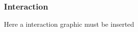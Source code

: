 \begin{frame}[allowframebreaks]
\frametitle{Interaction}
Here a interaction graphic must be inserted
\end{frame}
